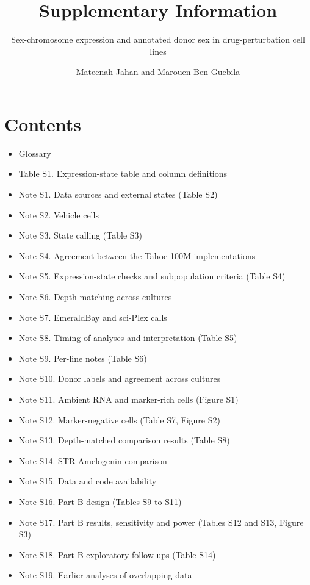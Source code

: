 \documentclass[
  11pt,
  letterpaper,
]{article}
\title{Supplementary Information}
\subtitle{Sex-chromosome expression and annotated donor sex in
drug-perturbation cell lines}
\author{Mateenah Jahan and Marouen Ben Guebila}
\date{}
\providecommand{\tightlist}{%
  \setlength{\itemsep}{0pt}\setlength{\parskip}{0pt}}
\begin{document}
\maketitle

\section*{Contents}\label{contents}

\begin{itemize}
\tightlist
\item
  Glossary
\item
  Table S1. Expression-state table and column definitions
\item
  Note S1. Data sources and external states (Table S2)
\item
  Note S2. Vehicle cells
\item
  Note S3. State calling (Table S3)
\item
  Note S4. Agreement between the Tahoe-100M implementations
\item
  Note S5. Expression-state checks and subpopulation criteria (Table S4)
\item
  Note S6. Depth matching across cultures
\item
  Note S7. EmeraldBay and sci-Plex calls
\item
  Note S8. Timing of analyses and interpretation (Table S5)
\item
  Note S9. Per-line notes (Table S6)
\item
  Note S10. Donor labels and agreement across cultures
\item
  Note S11. Ambient RNA and marker-rich cells (Figure S1)
\item
  Note S12. Marker-negative cells (Table S7, Figure S2)
\item
  Note S13. Depth-matched comparison results (Table S8)
\item
  Note S14. STR Amelogenin comparison
\item
  Note S15. Data and code availability
\item
  Note S16. Part B design (Tables S9 to S11)
\item
  Note S17. Part B results, sensitivity and power (Tables S12 and S13,
  Figure S3)
\item
  Note S18. Part B exploratory follow-ups (Table S14)
\item
  Note S19. Earlier analyses of overlapping data
\end{itemize}
\end{document}
